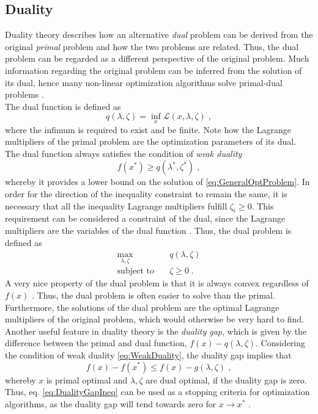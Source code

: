 \subsection{Duality}
Duality theory describes how an alternative \textit{dual} problem can be derived from the original \textit{primal} problem and how the two problems are related. Thus, the dual problem can be regarded as a different perspective of the original problem. Much information regarding the original problem can be inferred from the solution of its dual, hence many non-linear optimization algorithms solve primal-dual problems \cite{wright}.\\
The dual function is defined as
\begin{equation}
	q (\lambda , \zeta) = \inf_{x} \mathcal{L} (x,\lambda,\zeta) \; ,
\end{equation}
where the infimum is required to exist and be finite. Note how the Lagrange multipliers of the primal problem are the optimization parameters of its dual. The dual function always satisfies the condition of \textit{weak duality}
\begin{equation}
	f(x^*) \geq q (\lambda^* , \zeta^*) \; ,
	\label{eq:WeakDuality}
\end{equation} 
whereby it provides a lower bound on the solution of \eqref{eq:GeneralOptProblem}. In order for the direction of the inequality constraint to remain the same, it is necessary that all the inequality Lagrange multipliers fulfill $\zeta_i \geq 0$. This requirement can be considered a constraint of the dual, since the Lagrange multipliers are the variables of the dual function \cite{wright}. Thus, the dual problem is defined as
\begin{subequations}	
 \begin{align}
	\max_{\lambda , \zeta} 	\quad 	& q(\lambda , \zeta) 				\\
	\text{subject to} 		\quad 	& \zeta \geq 0  			\; .
\end{align}
\label{eq:GeneralDualProblem}
\end{subequations}
A very nice property of the dual problem is that it is always convex regardless of $f(x)$ \cite{Rockafellar1974}. Thus, the dual problem is often easier to solve than the primal. Furthermore, the solutions of the dual problem are the optimal Lagrange multipliers of the original problem, which would otherwise be very hard to find.
Another useful feature in duality theory is the \textit{duality gap}, which is given by the difference between the primal and dual function, $f(x) - q(\lambda , \zeta )$. Considering the condition of weak duality \eqref{eq:WeakDuality}, the duality gap implies that
\begin{equation}
	f(x) - f(x^*) \leq f(x) - g(\lambda , \zeta) \; ,
	\label{eq:DualityGapIneq}
\end{equation}
whereby $x$ is primal optimal and $\lambda , \zeta$ are dual optimal, if the duality gap is zero. Thus, eq. \eqref{eq:DualityGapIneq} can be used as a stopping criteria for optimization algorithms, as the duality gap will tend towards zero for $x \to x^*$ \cite{wright}.


